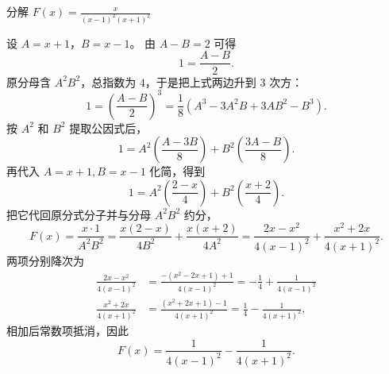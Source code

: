 \begin{example}[分解 $\frac{x}{(x-1)^2(x+1)^2}$]
    分解 $\displaystyle F(x) = \frac{x}{(x-1)^2(x+1)^2}$
\end{example}
\begin{solution}
设 $A = x+1$，$B = x-1$。
由 $A - B = 2$ 可得
$$ 1 = \frac{A - B}{2}. $$
原分母含 $A^2B^2$，总指数为 $4$，于是把上式两边升到 $3$ 次方：
$$ 1 = \left(\frac{A - B}{2}\right)^3 = \frac{1}{8}(A^3 - 3A^2B + 3AB^2 - B^3). $$
按 $A^2$ 和 $B^2$ 提取公因式后，
$$ 1 = A^2 \left( \frac{A - 3B}{8} \right) + B^2 \left( \frac{3A - B}{8} \right). $$
再代入 $A=x+1, B=x-1$ 化简，得到
$$ 1 = A^2 \left( \frac{2-x}{4} \right) + B^2 \left( \frac{x+2}{4} \right). $$
把它代回原分式分子并与分母 $A^2B^2$ 约分，
$$ F(x) = \frac{x \cdot 1}{A^2 B^2} = \frac{x(2-x)}{4 B^2} + \frac{x(x+2)}{4 A^2} = \frac{2x-x^2}{4(x-1)^2} + \frac{x^2+2x}{4(x+1)^2}. $$
两项分别降次为
\begin{align*}
\frac{2x-x^2}{4(x-1)^2} &= \frac{-(x^2-2x+1)+1}{4(x-1)^2} = -\frac{1}{4} + \frac{1}{4(x-1)^2} \\
\frac{x^2+2x}{4(x+1)^2} &= \frac{(x^2+2x+1)-1}{4(x+1)^2} = \frac{1}{4} - \frac{1}{4(x+1)^2},
\end{align*}
相加后常数项抵消，因此
$$ F(x) = \frac{1}{4(x-1)^2} - \frac{1}{4(x+1)^2}. $$
\end{solution}

